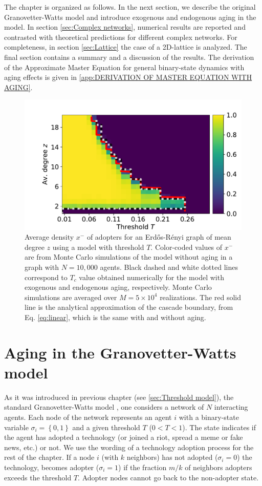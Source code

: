 The chapter is organized as follows. In the next section, we describe the original Granovetter-Watts model and introduce exogenous and endogenous aging in the model. In section \ref{sec:Complex networks}, numerical results are reported and contrasted with theoretical predictions for different complex networks. For completeness, in section \ref{sec:Lattice} the case of a 2D-lattice is analyzed. The final section contains a summary and a discussion of the results. The derivation of the Approximate Master Equation for general binary-state dynamics with aging effects is given in \ref{app:DERIVATION OF MASTER EQUATION WITH AGING}.
\begin{figure}[bh!]
    \centering \captionsetup{font=sf}
    \includegraphics[width=0.65\columnwidth]{Figs/Aging_Threshold/cascade.pdf}
    \caption[Average density $x^{-}$ of adopters for an Erd\H{o}s-R\'enyi graph]{\label{fig:umbral} Average density $x^{-}$ of adopters for an Erd\H{o}s-R\'enyi graph of mean degree $z$ using a model with threshold $T$. Color-coded values of $x^{-}$ are from Monte Carlo simulations of the model without aging in a graph with $N = 10,000$ agents.  Black dashed and white dotted lines correspond to $T_c$ value obtained numerically for the model with exogenous and endogenous aging, respectively.  Monte Carlo simulations are averaged over $M = 5 \times 10^4$ realizations. The red solid line is the analytical approximation of the cascade boundary, from Eq. \eqref{eq:linear}, which is the same with and without aging.}
\end{figure}

\section{\label{sec:Threshold model with aging} Aging in the Granovetter-Watts model}

As it was introduced in previous chapter (see \ref{sec:Threshold model}), the standard Granovetter-Watts model \cite{granovetter-1978,watts-2002}, one considers a network of $N$ interacting agents. Each node of the network represents an agent $i$ with a binary-state variable $\sigma_i = \left\{ 0,1 \right\}$  and a given threshold $T$ ($0<T<1$). The state indicates if the agent has adopted a technology (or joined a riot, spread a meme or fake news, etc.) or not. We use the wording of a technology adoption process for the rest of the chapter. If a node $i$ (with $k$ neighbors) has not adopted  ($\sigma_i = 0$) the technology, becomes adopter ($\sigma_i = 1$) if the fraction $m / k$ of neighbors adopters exceeds the threshold $T$. Adopter nodes cannot go back to the non-adopter state.

